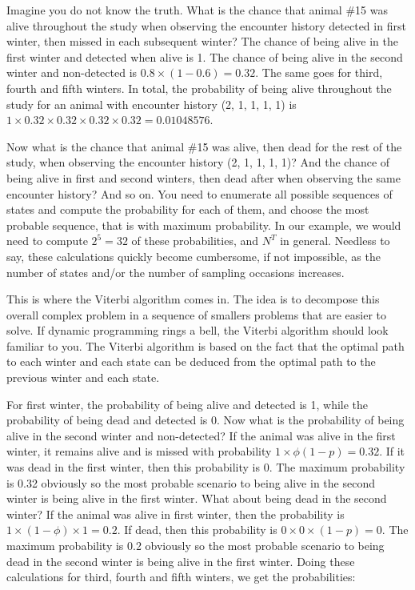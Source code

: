 \documentclass[
  12pt,
]{krantz}
\begin{document}
Imagine you do not know the truth. What is the chance that animal \#15 was alive throughout the study when observing the encounter history detected in first winter, then missed in each subsequent winter? The chance of being alive in the first winter and detected when alive is 1. The chance of being alive in the second winter and non-detected is \(0.8 \times (1-0.6) = 0.32\). The same goes for third, fourth and fifth winters. In total, the probability of being alive throughout the study for an animal with encounter history (2, 1, 1, 1, 1) is \(1 \times 0.32 \times 0.32 \times 0.32 \times 0.32 = 0.01048576\).

Now what is the chance that animal \#15 was alive, then dead for the rest of the study, when observing the encounter history (2, 1, 1, 1, 1)? And the chance of being alive in first and second winters, then dead after when observing the same encounter history? And so on. You need to enumerate all possible sequences of states and compute the probability for each of them, and choose the most probable sequence, that is with maximum probability. In our example, we would need to compute \(2^5 = 32\) of these probabilities, and \(N^T\) in general. Needless to say, these calculations quickly become cumbersome, if not impossible, as the number of states and/or the number of sampling occasions increases.

This is where the Viterbi algorithm comes in. The idea is to decompose this overall complex problem in a sequence of smallers problems that are easier to solve. If dynamic programming rings a bell, the Viterbi algorithm should look familiar to you. The Viterbi algorithm is based on the fact that the optimal path to each winter and each state can be deduced from the optimal path to the previous winter and each state.

For first winter, the probability of being alive and detected is 1, while the probability of being dead and detected is 0. Now what is the probability of being alive in the second winter and non-detected? If the animal was alive in the first winter, it remains alive and is missed with probability \(1 \times \phi (1-p) = 0.32\). If it was dead in the first winter, then this probability is 0. The maximum probability is 0.32 obviously so the most probable scenario to being alive in the second winter is being alive in the first winter. What about being dead in the second winter? If the animal was alive in first winter, then the probability is \(1 \times (1-\phi) \times 1 = 0.2\). If dead, then this probability is \(0 \times 0 \times (1-p) = 0\). The maximum probability is 0.2 obviously so the most probable scenario to being dead in the second winter is being alive in the first winter. Doing these calculations for third, fourth and fifth winters, we get the probabilities:
\end{document}
